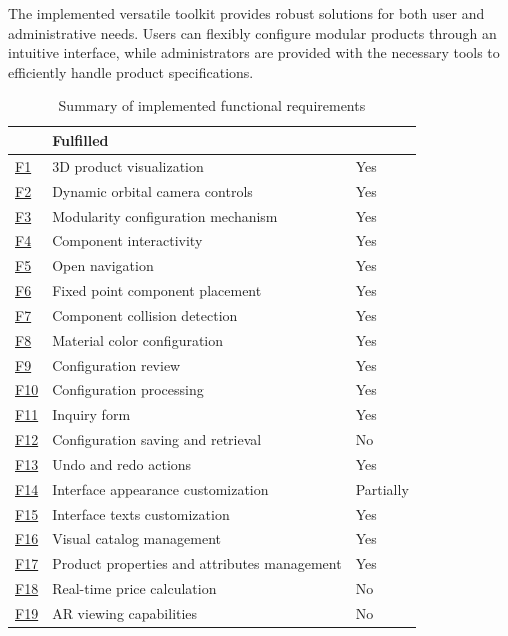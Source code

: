 The implemented versatile toolkit provides robust solutions for both user and administrative needs. Users can flexibly configure modular products through an intuitive interface, while administrators are provided with the necessary tools to efficiently handle product specifications.

\begin{table}[htb]
\centering
\begin{tabular}{>{\raggedright\arraybackslash}p{0.5cm} >{\raggedright\arraybackslash}p{8cm} >{\centering\arraybackslash}p{2cm}}
\toprule
\multicolumn{2}{c}{\textbf{Requirement}} &
\textbf{Fulfilled}\\ 
\midrule
\hyperref[itm:F1]{F1} & 3D product visualization &
    Yes \\
\hyperref[itm:F2]{F2} & Dynamic orbital camera controls &
    Yes \\
\hyperref[itm:F3]{F3} & Modularity configuration mechanism &
    Yes \\
\hyperref[itm:F4]{F4} & Component interactivity &
    Yes \\
\hyperref[itm:F5]{F5} & Open navigation &
    Yes \\
\hyperref[itm:F6]{F6} & Fixed point component placement &
    Yes \\
\hyperref[itm:F7]{F7} & Component collision detection &
    Yes \\
\hyperref[itm:F8]{F8} & Material color configuration &
    Yes \\
\hyperref[itm:F9]{F9} & Configuration review &
    Yes \\
\hyperref[itm:F10]{F10} & Configuration processing &
    Yes \\
\hyperref[itm:F11]{F11} & Inquiry form &
    Yes \\
\hyperref[itm:F12]{F12} & Configuration saving and retrieval &
    No \\
\hyperref[itm:F13]{F13} & Undo and redo actions &
    Yes \\
\hyperref[itm:F14]{F14} & Interface appearance customization &
    Partially \\
\hyperref[itm:F15]{F15} & Interface texts customization &
    Yes \\
\hyperref[itm:F16]{F16} & Visual catalog management &
    Yes \\
\hyperref[itm:F17]{F17} & Product properties and attributes management &
    Yes \\
\hyperref[itm:F18]{F18} & Real-time price calculation &
    No \\
\hyperref[itm:F19]{F19} & AR viewing capabilities &
    No \\
\bottomrule
\end{tabular}
\caption{Summary of implemented functional requirements}
\label{table:summary-implementation}
\end{table}


